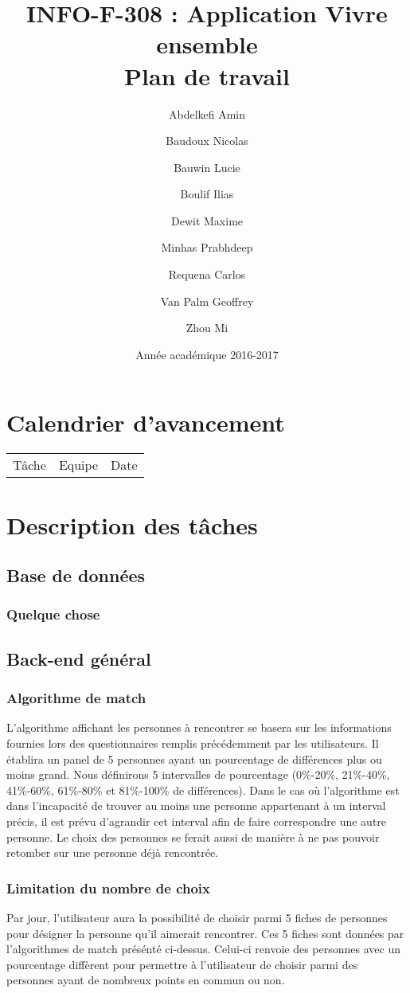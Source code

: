 \documentclass[10pt]{article}
\title{INFO-F-308 : Application Vivre ensemble \\ Plan de travail}
\author{Abdelkefi Amin \and Baudoux Nicolas \and Bauwin Lucie \and Boulif Ilias \and Dewit Maxime \and  Minhas Prabhdeep \and Requena Carlos \and Van Palm Geoffrey \and Zhou Mi}
\date{Année académique 2016-2017}
\begin{document}
 
 \maketitle
 \newpage
 \section{Calendrier d'avancement}
  \begin{tabular}{ l | c | r }
   Tâche & Equipe & Date \\ 
  \end{tabular}
 
 \section{Description des tâches}
  \subsection{Base de données}
   \subsubsection{Quelque chose}
   
  \subsection{Back-end général}
   \subsubsection{Algorithme de match}
    L’algorithme affichant les personnes à rencontrer se basera sur les informations fournies lors des questionnaires remplis précédemment
    par les utilisateurs. 
    Il établira un panel de 5 personnes ayant un pourcentage de différences plus ou moins grand.
    Nous définirons 5 intervalles de pourcentage (0\%-20\%, 21\%-40\%, 41\%-60\%, 61\%-80\% et 81\%-100\% de différences).   
    Dans le cas où l’algorithme est dans l’incapacité de trouver au moins une personne appartenant à un interval précis,
    il est prévu d’agrandir cet interval afin de faire correspondre une autre personne.
    Le choix des personnes se ferait aussi de manière à ne pas pouvoir retomber sur une personne déjà rencontrée. 
   \subsubsection{Limitation du nombre de choix}
    Par jour, l'utilisateur aura la possibilité de choisir parmi 5 fiches de personnes pour désigner la personne qu'il aimerait rencontrer. 
    Ces 5 fiches sont données par l'algorithmes de match présénté ci-dessus. 
    Celui-ci renvoie des personnes avec un pourcentage diffèrent pour permettre à l'utilisateur de choisir parmi des personnes ayant de 
    nombreux points en commun ou non.    
\end{document}
